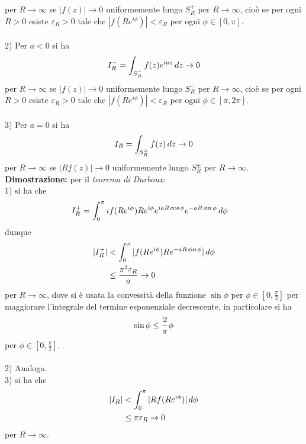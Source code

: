 \documentclass{article}
\begin{document}
per $R \rightarrow \infty$ se $|f(z)| \rightarrow 0$ uniformemente lungo $S^+_R$ per $R \rightarrow \infty$, cioè se per ogni $R > 0$ esiste $\varepsilon_R > 0$ tale che $|f(Re^{i\phi})| < \varepsilon_R$ per ogni $\phi \in [0, \pi]$. \\ \\
2) Per $a < 0$ si ha
\begin{gather}
    I^-_R = \int_{S^-_R}f(z)e^{iaz} \, dz \rightarrow 0 \notag
\end{gather}
per $R \rightarrow \infty$ se $|f(z)| \rightarrow 0$ uniformemente lungo $S^-_R$ per $R \rightarrow \infty$, cioè se per ogni $R > 0$ esiste $\varepsilon_R > 0$ tale che $|f(Re^{i\phi})| < \varepsilon_R$ per ogni $\phi \in [\pi, 2\pi]$. \\ \\
3) Per $a = 0$ si ha
\begin{gather}
    I_R = \int_{S^\pm_R}f(z) \, dz \rightarrow 0 \notag
\end{gather}
per $R \rightarrow \infty$ se $|Rf(z)| \rightarrow 0$ uniformemente lungo $S^\pm_R$ per $R \rightarrow \infty$. \\

\textbf{Dimostrazione:} per il \textit{teorema di Darboux}: \\
1) si ha che
\begin{align}
    I^+_R &= \int_0^\pi if(Re^{i\phi})Re^{i\phi}e^{iaR\cos\phi}e^{-aR\sin\phi} \, d\phi \notag
\end{align}
dunque
\begin{align}
    |I^+_R| &< \int_0^\pi |f(Re^{i\phi})Re^{-aR\sin\phi}| \, d\phi \notag \\
    &\leq \frac{\pi^2\varepsilon_R}{a} \rightarrow 0 \notag
\end{align}
per $R \rightarrow \infty$, dove si è usata la convessità della funzione $\sin\phi$ per $\phi \in [0, \frac{\pi}{2}]$ per maggiorare l'integrale del termine esponenziale decrescente, in particolare si ha
\begin{gather}
    \sin\phi \leq \frac{2}{\pi}\phi \notag
\end{gather}
per $\phi \in [0, \frac{\pi}{2}]$. \\ \\
2) Analoga. \\
3) si ha che
\begin{align}
    |I_R| &< \int_0^\pi |Rf(Re^{i\phi})| \, d\phi \notag \\
    &\leq \pi\varepsilon_R \rightarrow 0 \notag
\end{align}
per $R \rightarrow \infty$. \\ \\
\end{document}
